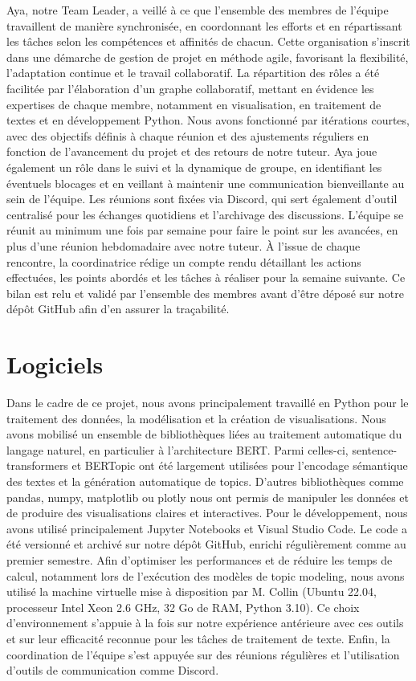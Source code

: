 \documentclass[mstat,12pt]{unswthesis}
\begin{document}
Aya, notre Team Leader, a veillé à ce que l’ensemble des membres de l’équipe travaillent de manière synchronisée, en coordonnant les efforts et en répartissant les tâches selon les compétences et affinités de chacun. Cette organisation s’inscrit dans une démarche de gestion de projet en méthode agile, favorisant la flexibilité, l’adaptation continue et le travail collaboratif. La répartition des rôles a été facilitée par l’élaboration d’un graphe collaboratif, mettant en évidence les expertises de chaque membre, notamment en visualisation, en traitement de textes et en développement Python. Nous avons fonctionné par itérations courtes, avec des objectifs définis à chaque réunion et des ajustements réguliers en fonction de l’avancement du projet et des retours de notre tuteur. Aya joue également un rôle dans le suivi et la dynamique de groupe, en identifiant les éventuels blocages et en veillant à maintenir une communication bienveillante au sein de l’équipe. Les réunions sont fixées via Discord, qui sert également d’outil centralisé pour les échanges quotidiens et l’archivage des discussions. L’équipe se réunit au minimum une fois par semaine pour faire le point sur les avancées, en plus d’une réunion hebdomadaire avec notre tuteur. À l’issue de chaque rencontre, la coordinatrice rédige un compte rendu détaillant les actions effectuées, les points abordés et les tâches à réaliser pour la semaine suivante. Ce bilan est relu et validé par l’ensemble des membres avant d’être déposé sur notre dépôt GitHub afin d’en assurer la traçabilité.

\hypertarget{logiciels}{%
\section{Logiciels}\label{logiciels}}

Dans le cadre de ce projet, nous avons principalement travaillé en Python pour le traitement des données, la modélisation et la création de visualisations. Nous avons mobilisé un ensemble de bibliothèques liées au traitement automatique du langage naturel, en particulier à l’architecture BERT. Parmi celles-ci, sentence-transformers et BERTopic ont été largement utilisées pour l’encodage sémantique des textes et la génération automatique de topics. D’autres bibliothèques comme pandas, numpy, matplotlib ou plotly nous ont permis de manipuler les données et de produire des visualisations claires et interactives. Pour le développement, nous avons utilisé principalement Jupyter Notebooks et Visual Studio Code. Le code a été versionné et archivé sur notre dépôt GitHub, enrichi régulièrement comme au premier semestre. Afin d’optimiser les performances et de réduire les temps de calcul, notamment lors de l’exécution des modèles de topic modeling, nous avons utilisé la machine virtuelle mise à disposition par M. Collin (Ubuntu 22.04, processeur Intel Xeon 2.6 GHz, 32 Go de RAM, Python 3.10). Ce choix d’environnement s’appuie à la fois sur notre expérience antérieure avec ces outils et sur leur efficacité reconnue pour les tâches de traitement de texte. Enfin, la coordination de l’équipe s’est appuyée sur des réunions régulières et l’utilisation d’outils de communication comme Discord.
\end{document}
